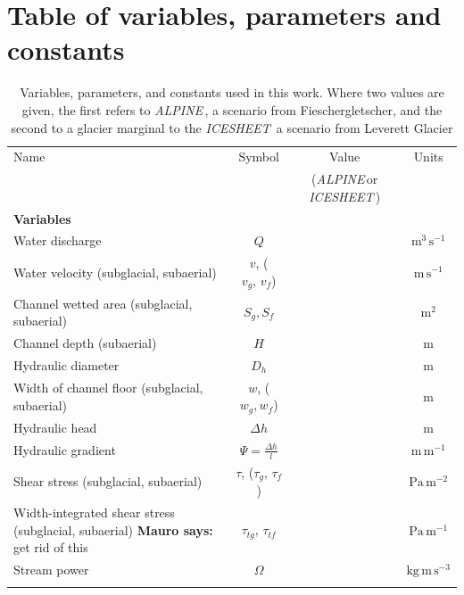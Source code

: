 \documentclass[draft]{agujournal2019}
\newcommand{\mauro}[1]{{\textbf{\color{green}Mauro says:} \color{green} #1} }
\newcommand{\alpine}{\textit{ALPINE}\,}
\newcommand{\icesheet}{\textit{ICESHEET}\,}
\begin{document}
\section{Table of variables, parameters and constants}
\begin{table}[h]
  \centering
  \caption{Variables, parameters, and constants used in this work.
    Where two values are given, the first refers to  \alpine{}, a scenario from Fieschergletscher, and the second to a glacier marginal to the \icesheet{} a scenario from Leverett Glacier}
  \tiny %
  \begin{tabular}{ l  c  c c }
    Name &Symbol&  Value&Units \\
    && (\alpine or \icesheet)\\
    \hline
    \textbf{Variables}  & & & \\
    Water discharge  & $Q$& & $\mathrm{m^{3}\,s^{-1}}$ \\
    Water velocity (subglacial, subaerial)  & $v$, ($v_g,\,v_{f}$)& & $\mathrm{m\,s^{-1}}$ \\
    Channel wetted area (subglacial, subaerial) &  $S_g, S_f$& & $\mathrm{m^2}$     \\
    Channel depth (subaerial) & $H$&& $\mathrm{m}$\\
    Hydraulic diameter &$D_h$&&$\mathrm{m}$\\
    Width of channel floor (subglacial, subaerial) & $w$, ($w_g,w_f$)&  & $\mathrm{m}$     \\
    Hydraulic head &$\Delta h$&& $\mathrm{m}$\\
    Hydraulic gradient &$\Psi=\frac{\Delta h}{l}$&& $\mathrm{m\, m^{-1}}$\\

    Shear stress (subglacial, subaerial) & $\tau$, ($\tau_g,\,\tau_f$) && $\mathrm{Pa \, m^{-2}}$ \\
    Width-integrated shear stress (subglacial, subaerial) \mauro{get rid of this} & $\tau_{tg},\, \tau_{tf}$&& $\mathrm{Pa \, m^{-1}}$\\
    Stream power & $\Omega$ && $\mathrm{ kg \, m\, s^{-3}}$ \\

         &&&\\


\end{tabular}
\end{table}
\end{document}
